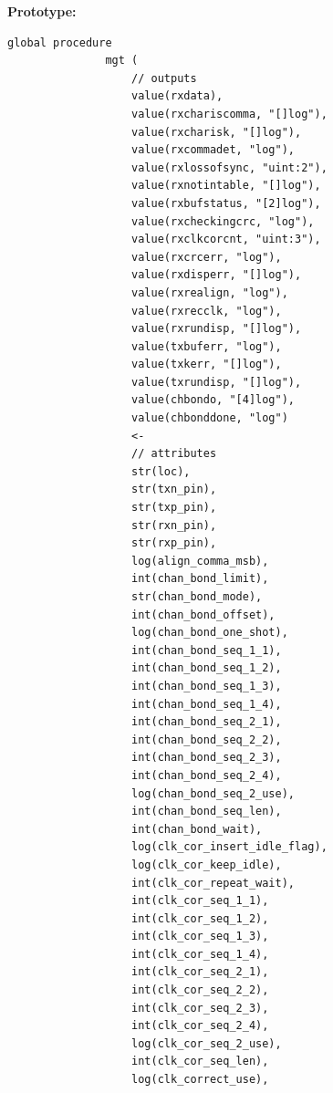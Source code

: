             {\bf Prototype:} \\
            \vsp
            \begin{lstlisting}[gobble=12, language=threepl]
               global procedure
               mgt (
                   // outputs
                   value(rxdata),
                   value(rxchariscomma, "[]log"),
                   value(rxcharisk, "[]log"),
                   value(rxcommadet, "log"),
                   value(rxlossofsync, "uint:2"),
                   value(rxnotintable, "[]log"),
                   value(rxbufstatus, "[2]log"),
                   value(rxcheckingcrc, "log"),
                   value(rxclkcorcnt, "uint:3"),
                   value(rxcrcerr, "log"),
                   value(rxdisperr, "[]log"),
                   value(rxrealign, "log"),
                   value(rxrecclk, "log"),
                   value(rxrundisp, "[]log"),
                   value(txbuferr, "log"),
                   value(txkerr, "[]log"),
                   value(txrundisp, "[]log"),
                   value(chbondo, "[4]log"),
                   value(chbonddone, "log")
                   <-
                   // attributes
                   str(loc),
                   str(txn_pin),
                   str(txp_pin),
                   str(rxn_pin),
                   str(rxp_pin),
                   log(align_comma_msb),
                   int(chan_bond_limit),
                   str(chan_bond_mode),
                   int(chan_bond_offset),
                   log(chan_bond_one_shot),
                   int(chan_bond_seq_1_1),
                   int(chan_bond_seq_1_2),
                   int(chan_bond_seq_1_3),
                   int(chan_bond_seq_1_4),
                   int(chan_bond_seq_2_1),
                   int(chan_bond_seq_2_2),
                   int(chan_bond_seq_2_3),
                   int(chan_bond_seq_2_4),
                   log(chan_bond_seq_2_use),
                   int(chan_bond_seq_len),
                   int(chan_bond_wait),
                   log(clk_cor_insert_idle_flag),
                   log(clk_cor_keep_idle),
                   int(clk_cor_repeat_wait),
                   int(clk_cor_seq_1_1),
                   int(clk_cor_seq_1_2),
                   int(clk_cor_seq_1_3),
                   int(clk_cor_seq_1_4),
                   int(clk_cor_seq_2_1),
                   int(clk_cor_seq_2_2),
                   int(clk_cor_seq_2_3),
                   int(clk_cor_seq_2_4),
                   log(clk_cor_seq_2_use),
                   int(clk_cor_seq_len),
                   log(clk_correct_use),

\end{lstlisting}
